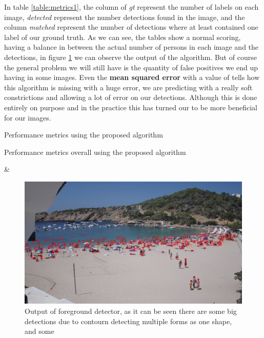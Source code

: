 \documentclass[11pt]{article}
\begin{document}
In table \ref{table:metrics1}, the column of \textit{gt} represent the number of labels on each image, \textit{detected} represent the number detections found in the image, and the column \textit{matched} represent the number of detections where at least contained one label of our ground truth. As we can see, the tables show a normal scoring, having a balance in between the actual number of persons in each image and the detections, in figure \ref*{fig:detections} we can observe the output of the algorithm. But of course the general problem we will still have is the quantity of false positives we end up having in some images. Even the \textbf{mean squared error} with a value of  tells how this algorithm is missing with a huge error, we are predicting with a really soft constrictions and allowing a lot of error on our detections. Although this is done entirely on purpose and in the practice this has turned our to be more beneficial for our images.\newline


\begin{table} [h]
  \centering
  \caption[Performance metrics Basic]{Performance metrics using the proposed algorithm}\label{table:metrics1}
\end{table}

\begin{table} [h]
  \centering
  \caption[Performance metrics overall]{Performance metrics overall using the proposed algorithm}\label{table:metrics_2}

  {\csvcoli & \csvcolii}%
\end{table}



\begin{figure}[h]
  \centering
  \includegraphics[width=\textwidth]{img/det_name.jpg}
  \caption{Output of foreground detector, as it can be seen there are some big detections due to contourn detecting multiple forms as one shape, and some }
  \label{fig:detections}
\end{figure}
\end{document}
